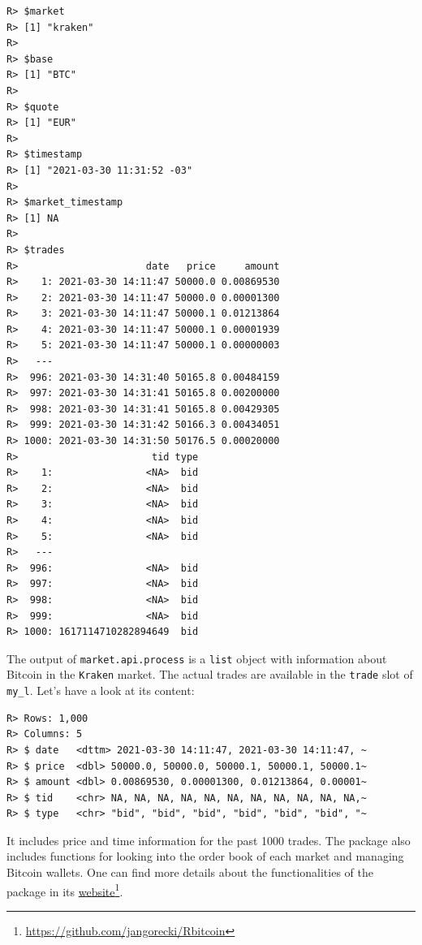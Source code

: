 \documentclass[
  12pt,
]{book}
\newenvironment{Shaded}{\begin{snugshade}}{\end{snugshade}}
\newcommand{\KeywordTok}[1]{\textcolor[rgb]{0.27,0.27,0.27}{\textbf{#1}}}
\newcommand{\NormalTok}[1]{#1}
\newcommand{\OperatorTok}[1]{\textcolor[rgb]{0.43,0.43,0.43}{\textbf{#1}}}
\begin{document}
\begin{verbatim}
R> $market
R> [1] "kraken"
R> 
R> $base
R> [1] "BTC"
R> 
R> $quote
R> [1] "EUR"
R> 
R> $timestamp
R> [1] "2021-03-30 11:31:52 -03"
R> 
R> $market_timestamp
R> [1] NA
R> 
R> $trades
R>                      date   price     amount
R>    1: 2021-03-30 14:11:47 50000.0 0.00869530
R>    2: 2021-03-30 14:11:47 50000.0 0.00001300
R>    3: 2021-03-30 14:11:47 50000.1 0.01213864
R>    4: 2021-03-30 14:11:47 50000.1 0.00001939
R>    5: 2021-03-30 14:11:47 50000.1 0.00000003
R>   ---                                       
R>  996: 2021-03-30 14:31:40 50165.8 0.00484159
R>  997: 2021-03-30 14:31:41 50165.8 0.00200000
R>  998: 2021-03-30 14:31:41 50165.8 0.00429305
R>  999: 2021-03-30 14:31:42 50166.3 0.00434051
R> 1000: 2021-03-30 14:31:50 50176.5 0.00020000
R>                       tid type
R>    1:                <NA>  bid
R>    2:                <NA>  bid
R>    3:                <NA>  bid
R>    4:                <NA>  bid
R>    5:                <NA>  bid
R>   ---                         
R>  996:                <NA>  bid
R>  997:                <NA>  bid
R>  998:                <NA>  bid
R>  999:                <NA>  bid
R> 1000: 1617114710282894649  bid
\end{verbatim}

The output of \texttt{market.api.process} is a \texttt{list} object with information about Bitcoin in the \texttt{\textquotesingle{}Kraken\textquotesingle{}} market. The actual trades are available in the \texttt{trade} slot of \texttt{my\_l}. Let's have a look at its content:

\begin{Shaded}
\end{Shaded}

\begin{verbatim}
R> Rows: 1,000
R> Columns: 5
R> $ date   <dttm> 2021-03-30 14:11:47, 2021-03-30 14:11:47, ~
R> $ price  <dbl> 50000.0, 50000.0, 50000.1, 50000.1, 50000.1~
R> $ amount <dbl> 0.00869530, 0.00001300, 0.01213864, 0.00001~
R> $ tid    <chr> NA, NA, NA, NA, NA, NA, NA, NA, NA, NA, NA,~
R> $ type   <chr> "bid", "bid", "bid", "bid", "bid", "bid", "~
\end{verbatim}

It includes price and time information for the past 1000 trades. The package also includes functions for looking into the order book of each market and managing Bitcoin wallets. One can find more details about the functionalities of the package in its \href{https://github.com/jangorecki/Rbitcoin}{website}\footnote{\url{https://github.com/jangorecki/Rbitcoin}}.
\end{document}
